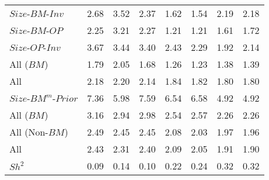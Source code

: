 \begin{table}[!ht]
\begin{tabular}{lrrrrrrr}
    $Size$-$BM$-$Inv$  & 2.68  & 3.52  & 2.37  & 1.62  & 1.54  & 2.19  & 2.18  \\
  
    $Size$-$BM$-$OP$  & 2.25  & 3.21  & 2.27  & 1.21  & 1.21  & 1.61  & 1.72  \\
  
    $Size$-$OP$-$Inv$  & 3.67  & 3.44  & 3.40  & 2.43  & 2.29  & 1.92  & 2.14  \\
  [1em]
    All ($BM$)  & 1.79  & 2.05  & 1.68  & 1.26  & 1.23  & 1.38  & 1.39  \\
  
    All  & 2.18  & 2.20  & 2.14  & 1.84  & 1.82  & 1.80  & 1.80  \\
  [1em]
    $Size$-$BM^m$-$Prior$  & 7.36  & 5.98  & 7.59  & 6.54  & 6.58  & 4.92  & 4.92  \\
  [1em]
    All ($BM$)  & 3.16  & 2.94  & 2.98  & 2.54  & 2.57  & 2.26  & 2.26  \\
  
    All (Non-$BM$)  & 2.49  & 2.45  & 2.45  & 2.08  & 2.03  & 1.97  & 1.96  \\
  
    All  & 2.43  & 2.31  & 2.40  & 2.09  & 2.05  & 1.91  & 1.90  \\
  [1em]
    $Sh^2$  & 0.09  & 0.14  & 0.10  & 0.22  & 0.24  & 0.32  & 0.32  \\
  
  \bottomrule
\end{tabular}
\label{tbl:GRS}
\end{table}